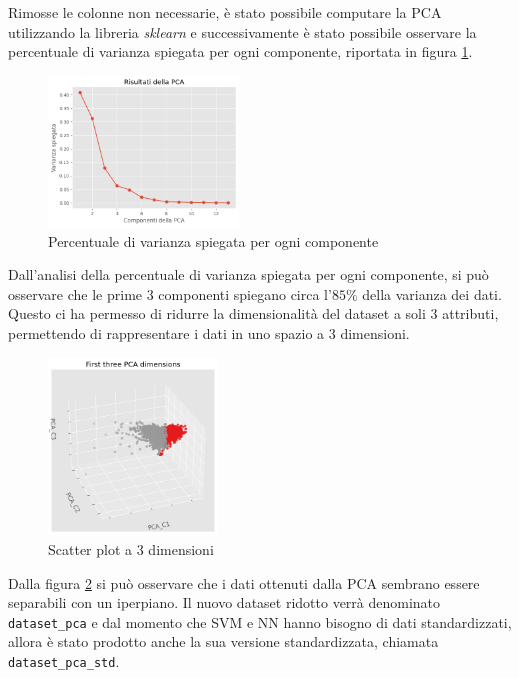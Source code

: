Rimosse le colonne non necessarie, è stato possibile computare la PCA utilizzando
la libreria \textit{sklearn} e successivamente è stato possibile osservare la
percentuale di varianza spiegata per ogni componente, riportata in figura \ref{fig:pca}.
\begin{figure}[!ht]
      \centering
      \includegraphics[width=0.45\textwidth]{img/analisi/pcaVarianza.png}
      \caption{Percentuale di varianza spiegata per ogni componente}
      \label{fig:pca}
\end{figure}

Dall'analisi della percentuale di varianza spiegata per ogni componente, si può
osservare che le prime $3$ componenti spiegano circa l'$85\%$ della varianza
dei dati. Questo ci ha permesso di ridurre la dimensionalità del dataset a soli
$3$ attributi, permettendo di rappresentare i dati in uno spazio a $3$ dimensioni.
\begin{figure}[!ht]
      \centering
      \includegraphics[width=0.4\textwidth]{img/analisi/pcaNuovoDataset.png}
      \caption{Scatter plot a 3 dimensioni}
      \label{fig:pca-3d}
\end{figure}

Dalla figura \ref{fig:pca-3d} si può osservare che i dati ottenuti dalla PCA
sembrano essere separabili con un iperpiano. Il nuovo dataset ridotto verrà
denominato \texttt{dataset\_pca} e dal momento che SVM e NN hanno bisogno di dati
standardizzati, allora è stato prodotto anche la sua versione standardizzata,
chiamata \texttt{dataset\_pca\_std}.